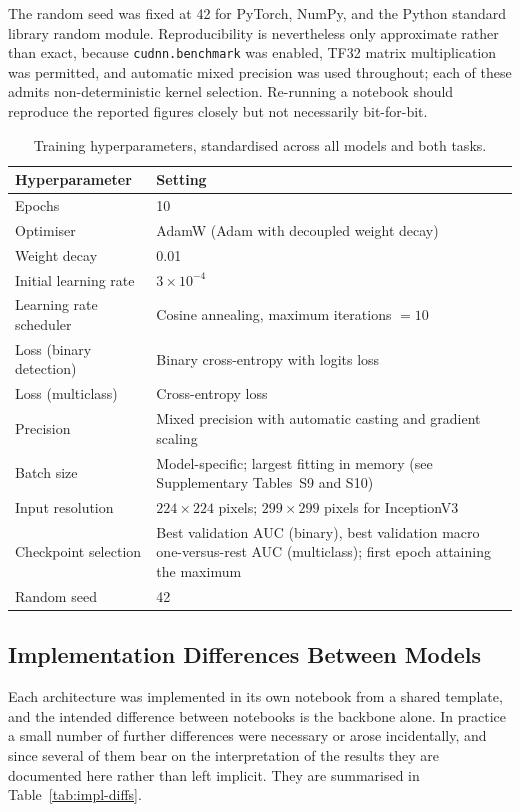 \documentclass[final,3p,times,number]{elsarticle}
\begin{document}
The random seed was fixed at 42 for PyTorch, NumPy, and the Python standard library random module. Reproducibility is nevertheless only approximate rather than exact, because \texttt{cudnn.benchmark} was enabled, TF32 matrix multiplication was permitted, and automatic mixed precision was used throughout; each of these admits non-deterministic kernel selection. Re-running a notebook should reproduce the reported figures closely but not necessarily bit-for-bit.

\begin{table}[htbp]
\centering
\caption{Training hyperparameters, standardised across all models and both tasks.}
\label{tab:hyperparams}
\small
\begin{tabularx}{\textwidth}{@{}lY@{}}
\toprule
Hyperparameter & Setting \\
\midrule
Epochs & 10 \\
Optimiser & AdamW (Adam with decoupled weight decay) \\
Weight decay & 0.01 \\
Initial learning rate & $3\times 10^{-4}$ \\
Learning rate scheduler & Cosine annealing, maximum iterations $=10$ \\
Loss (binary detection) & Binary cross-entropy with logits loss \\
Loss (multiclass) & Cross-entropy loss \\
Precision & Mixed precision with automatic casting and gradient scaling \\
Batch size & Model-specific; largest fitting in memory (see Supplementary Tables~S9 and S10) \\
Input resolution & $224\times 224$ pixels; $299\times 299$ pixels for InceptionV3 \\
Checkpoint selection & Best validation AUC (binary), best validation macro one-versus-rest AUC (multiclass); first epoch attaining the maximum \\
Random seed & 42 \\
\bottomrule
\end{tabularx}
\end{table}

\subsection{Implementation Differences Between Models}
\label{sec:impl}

Each architecture was implemented in its own notebook from a shared template, and the intended difference between notebooks is the backbone alone. In practice a small number of further differences were necessary or arose incidentally, and since several of them bear on the interpretation of the results they are documented here rather than left implicit. They are summarised in Table~\ref{tab:impl-diffs}.
\end{document}

